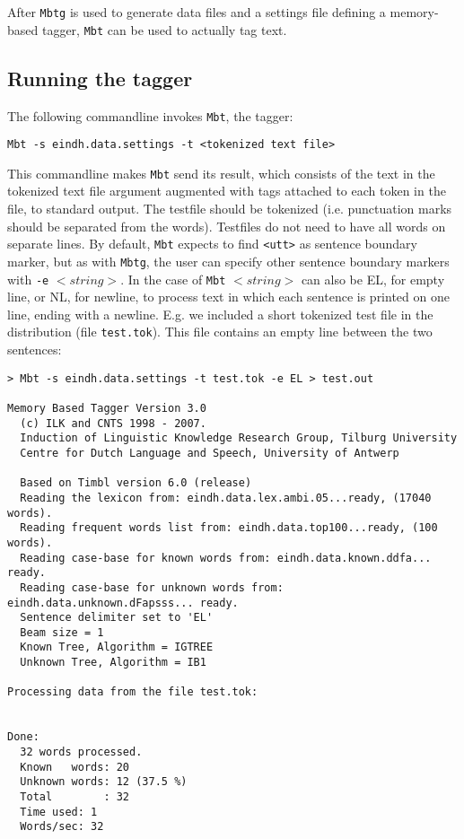 \documentclass{report}
\begin{document}
After {\tt Mbtg} is used to generate data files and a settings file
defining a memory-based tagger, {\tt Mbt} can be used to actually tag
text.

\subsection{Running the tagger}

The following commandline invokes {\tt Mbt}, the tagger:

{\small
\begin{verbatim}
Mbt -s eindh.data.settings -t <tokenized text file>
\end{verbatim}
}

This commandline makes {\tt Mbt} send its result, which consists of
the text in the tokenized text file argument augmented with tags
attached to each token in the file, to standard output. The testfile
should be tokenized (i.e. punctuation marks should be separated from
the words). Testfiles do not need to have all words on separate
lines. By default, {\tt Mbt} expects to find {\tt <utt>} as sentence
boundary marker, but as with {\tt Mbtg}, the user can specify other sentence
boundary markers with {\tt -e} $<string>$. In the case of {\tt Mbt}
$<string>$ can also be EL, for empty line, or NL, for newline, to
process text in which each sentence is printed on one line, ending
with a newline. E.g. we included a short tokenized test file in the
distribution (file {\tt test.tok}). This file contains an empty line
between the two sentences:

{\small
\begin{verbatim}
> Mbt -s eindh.data.settings -t test.tok -e EL > test.out

Memory Based Tagger Version 3.0
  (c) ILK and CNTS 1998 - 2007.
  Induction of Linguistic Knowledge Research Group, Tilburg University
  Centre for Dutch Language and Speech, University of Antwerp

  Based on Timbl version 6.0 (release)
  Reading the lexicon from: eindh.data.lex.ambi.05...ready, (17040 words).
  Reading frequent words list from: eindh.data.top100...ready, (100 words).
  Reading case-base for known words from: eindh.data.known.ddfa... ready.
  Reading case-base for unknown words from: eindh.data.unknown.dFapsss... ready.
  Sentence delimiter set to 'EL'
  Beam size = 1
  Known Tree, Algorithm = IGTREE
  Unknown Tree, Algorithm = IB1

Processing data from the file test.tok:


Done:
  32 words processed.
  Known   words: 20
  Unknown words: 12 (37.5 %)
  Total        : 32
  Time used: 1
  Words/sec: 32
\end{verbatim}
}
\end{document}
